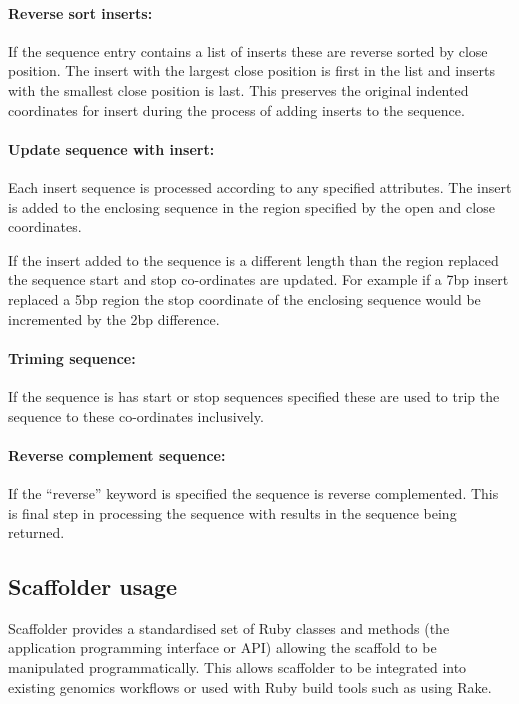 \documentclass[10pt]{bmc_article}
\newenvironment{bmcformat}{\begin{raggedright}\baselineskip20pt\sloppy\setboolean{publ}{false}}{\end{raggedright}\baselineskip20pt\sloppy}
\begin{document}
\begin{bmcformat}
\paragraph{Reverse sort inserts:} If the sequence entry contains a list of
inserts these are reverse sorted by close position. The insert with the
largest close position is first in the list and inserts with the smallest
close position is last. This preserves the original indented coordinates for
insert during the process of adding inserts to the sequence. \pb

\paragraph{Update sequence with insert:} Each insert sequence is processed
according to any specified attributes. The insert is added to the enclosing
sequence in the region specified by the open and close coordinates. \pb

If the insert added to the sequence is a different length than the region
replaced the sequence start and stop co-ordinates are updated. For example if
a 7bp insert replaced a 5bp region the stop coordinate of the enclosing
sequence would be incremented by the 2bp difference. \pb

\paragraph{Triming sequence:} If the sequence is has start or stop sequences
specified these are used to trip the sequence to these co-ordinates
inclusively. \pb 

\paragraph{Reverse complement sequence:} If the ``reverse'' keyword is
specified the sequence is reverse complemented. This is final step in
processing the sequence with results in the sequence being returned. \pb

\subsection*{Scaffolder usage} %

Scaffolder provides a standardised set of Ruby classes and methods (the
application programming interface or API) allowing the scaffold to be
manipulated programmatically. This allows scaffolder to be integrated into
existing genomics workflows or used with Ruby build tools such as using Rake.
\pb


\end{bmcformat}
\end{document}
